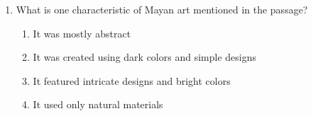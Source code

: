 \documentclass[12pt]{article}
\begin{document}
\begin{enumerate}
\vspace{0.5cm}

\item What is one characteristic of Mayan art mentioned in the passage?
\begin{enumerate}[label=\Alph*.]
    \item It was mostly abstract
    \item It was created using dark colors and simple designs
    \item It featured intricate designs and bright colors
    \item It used only natural materials
\end{enumerate}

\end{enumerate}
\end{document}
